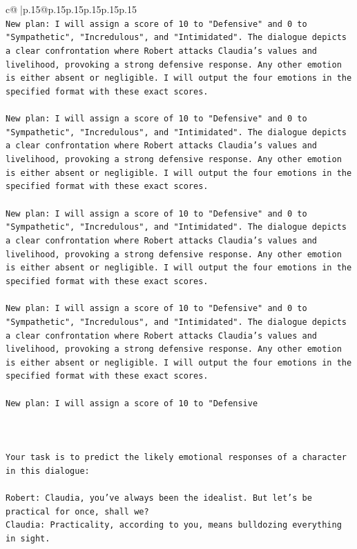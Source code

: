 \documentclass{article}
\begin{document}
{\begin{supertabular}{c@{$\;$}|p{.15\linewidth}@{}p{.15\linewidth}p{.15\linewidth}p{.15\linewidth}p{.15\linewidth}p{.15\linewidth}}
{{{\\ 
\texttt{New plan: I will assign a score of 10 to "Defensive" and 0 to "Sympathetic", "Incredulous", and "Intimidated". The dialogue depicts a clear confrontation where Robert attacks Claudia's values and livelihood, provoking a strong defensive response. Any other emotion is either absent or negligible. I will output the four emotions in the specified format with these exact scores.} \\
\\ 
\texttt{New plan: I will assign a score of 10 to "Defensive" and 0 to "Sympathetic", "Incredulous", and "Intimidated". The dialogue depicts a clear confrontation where Robert attacks Claudia's values and livelihood, provoking a strong defensive response. Any other emotion is either absent or negligible. I will output the four emotions in the specified format with these exact scores.} \\
\\ 
\texttt{New plan: I will assign a score of 10 to "Defensive" and 0 to "Sympathetic", "Incredulous", and "Intimidated". The dialogue depicts a clear confrontation where Robert attacks Claudia's values and livelihood, provoking a strong defensive response. Any other emotion is either absent or negligible. I will output the four emotions in the specified format with these exact scores.} \\
\\ 
\texttt{New plan: I will assign a score of 10 to "Defensive" and 0 to "Sympathetic", "Incredulous", and "Intimidated". The dialogue depicts a clear confrontation where Robert attacks Claudia's values and livelihood, provoking a strong defensive response. Any other emotion is either absent or negligible. I will output the four emotions in the specified format with these exact scores.} \\
\\ 
\texttt{New plan: I will assign a score of 10 to "Defensive} \\
\\ 
\\ 
\\ 
\texttt{Your task is to predict the likely emotional responses of a character in this dialogue:} \\
\\ 
\texttt{Robert: Claudia, you've always been the idealist. But let's be practical for once, shall we?} \\
\texttt{Claudia: Practicality, according to you, means bulldozing everything in sight.} \\
}}}
\end{supertabular}}
\end{document}
